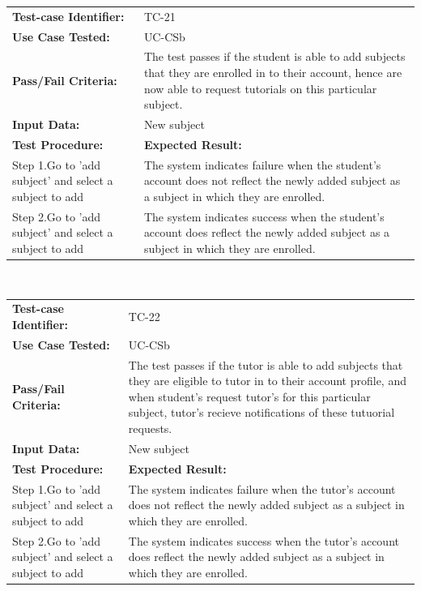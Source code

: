 \documentclass[12pt]{article}
\begin{document}
\begin{tabular}{| p{8cm} | p{8cm} |} \hline
	\textbf{Test-case Identifier:}& TC-21\\
	\textbf{Use Case Tested:}& UC-CSb\\
	\textbf{Pass/Fail Criteria:}& The test passes if the student is able to add subjects that they are enrolled in to their account, hence are now able to request tutorials on this particular subject.\\
	\textbf{Input Data:}& New subject\\\hline
	\textbf{Test Procedure:}& \textbf{Expected Result:} \\\hline
	Step 1.Go to 'add subject' and select a subject to add& The system indicates failure when the student's account does not reflect the newly added subject as a subject in which they are enrolled. \\
	Step 2.Go to 'add subject' and select a subject to add & The system indicates success when the student's account does reflect the newly added subject as a subject in which they are enrolled.\\
		\hline
\end{tabular}
\\

\begin{tabular}{| p{8cm} | p{8cm} |} \hline
	\textbf{Test-case Identifier:}& TC-22\\
	\textbf{Use Case Tested:}& UC-CSb\\
	\textbf{Pass/Fail Criteria:}& The test passes if the tutor is able to add subjects that they are eligible to tutor in to their account profile, and when student's request tutor's for this particular subject, tutor's recieve notifications of these tutuorial requests.\\
	\textbf{Input Data:}& New subject\\\hline
	\textbf{Test Procedure:}& \textbf{Expected Result:} \\\hline
	Step 1.Go to 'add subject' and select a subject to add& The system indicates failure when the tutor's account does not reflect the newly added subject as a subject in which they are enrolled. \\
	Step 2.Go to 'add subject' and select a subject to add & The system indicates success when the tutor's account does reflect the newly added subject as a subject in which they are enrolled.\\
		\hline
\end{tabular}
\\
\end{document}
